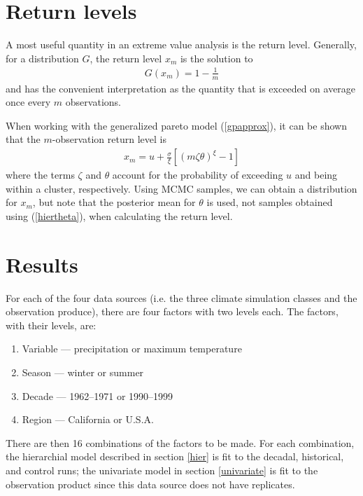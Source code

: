 \documentclass[12pt]{article}
\begin{document}
\section{Return levels}
\label{return}

A most useful quantity in an extreme value analysis is the return level. Generally, for a distribution $G$, the return level $x_m$ is the solution to
\begin{align}
G(x_m) = 1-\frac{1}{m}
\end{align}
and has the convenient interpretation as the quantity that is exceeded on average once every $m$ observations.

When working with the generalized pareto model (\ref{gpapprox}), it can be shown that the $m$-observation return level is
\begin{align}
x_m = u +\frac{\sigma}{\xi}\left[\left(m\zeta\theta\right)^\xi-1\right] \label{rl}
\end{align}
where the terms $\zeta$ and $\theta$ account for the probability of exceeding $u$ and being within a cluster, respectively. Using MCMC samples, we can obtain a distribution for $x_m$, but note that the posterior mean for $\theta$ is used, not samples obtained using (\ref{hiertheta}), when calculating the return level.



\section{Results}
\label{results}

For each of the four data sources (i.e. the three climate simulation classes and the observation produce), there are four factors with two levels each. The factors, with their levels, are:
\begin{enumerate}
\item Variable --- precipitation or maximum temperature
\item Season --- winter or summer
\item Decade --- 1962--1971 or 1990--1999
\item Region --- California or U.S.A.
\end{enumerate}
There are then 16 combinations of the factors to be made. For each combination, the hierarchial model described in section \ref{hier} is fit to the decadal, historical, and control runs; the univariate model in section \ref{univariate} is fit to the observation product since this data source does not have replicates.
\end{document}
